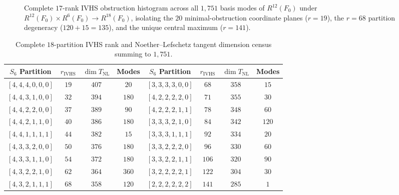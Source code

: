 \documentclass[11pt,a4paper]{article}
\begin{document}
\begin{figure}[htbp]
{%
  }
  \caption{Complete $17$-rank IVHS obstruction histogram across all $1{,}751$ basis modes of $R^{12}(F_0)$ under $R^{12}(F_0)\times R^6(F_0)\to R^{18}(F_0)$, isolating the $20$ minimal-obstruction coordinate planes ($r=19$), the $r=68$ partition degeneracy ($120+15=135$), and the unique central maximum ($r=141$).}
  \label{fig:ivhs_spectrum}
\end{figure}

\begin{table}[htbp]
  \centering
  \scriptsize
  \setlength{\tabcolsep}{3.5pt}
  \caption{Complete $18$-partition IVHS rank and Noether--Lefschetz tangent dimension census summing to $1{,}751$.}
  \label{tab:ivhs_18_partitions}
  \begin{tabular}{cccc|cccc}
    \toprule
    $S_6$ Partition & $r_{\mathrm{IVHS}}$ & $\dim T_{\mathrm{NL}}$ & Modes & $S_6$ Partition & $r_{\mathrm{IVHS}}$ & $\dim T_{\mathrm{NL}}$ & Modes \\
    \midrule
    $[4,4,4,0,0,0]$ & $19$ & $407$ & $20$ & $[3,3,3,3,0,0]$ & $68$ & $358$ & $15$ \\
    $[4,4,3,1,0,0]$ & $32$ & $394$ & $180$ & $[4,2,2,2,2,0]$ & $71$ & $355$ & $30$ \\
    $[4,4,2,2,0,0]$ & $37$ & $389$ & $90$ & $[4,2,2,2,1,1]$ & $78$ & $348$ & $60$ \\
    $[4,4,2,1,1,0]$ & $40$ & $386$ & $180$ & $[3,3,3,2,1,0]$ & $84$ & $342$ & $120$ \\
    $[4,4,1,1,1,1]$ & $44$ & $382$ & $15$ & $[3,3,3,1,1,1]$ & $92$ & $334$ & $20$ \\
    $[4,3,3,2,0,0]$ & $50$ & $376$ & $180$ & $[3,3,2,2,2,0]$ & $96$ & $330$ & $60$ \\
    $[4,3,3,1,1,0]$ & $54$ & $372$ & $180$ & $[3,3,2,2,1,1]$ & $106$ & $320$ & $90$ \\
    $[4,3,2,2,1,0]$ & $62$ & $364$ & $360$ & $[3,2,2,2,2,1]$ & $122$ & $304$ & $30$ \\
    $[4,3,2,1,1,1]$ & $68$ & $358$ & $120$ & $[2,2,2,2,2,2]$ & $141$ & $285$ & $1$ \\
    \bottomrule
  \end{tabular}
\end{table}
\end{document}
